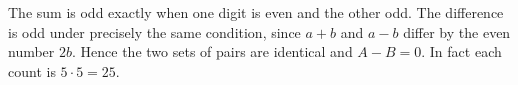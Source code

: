 The sum is odd exactly when one digit is even and the other odd. The difference is odd under precisely the same condition, since $a+b$ and $a-b$ differ by the even number $2b$. Hence the two sets of pairs are identical and $\boxed{A-B=0}$. In fact each count is $5\cdot5=25$.
